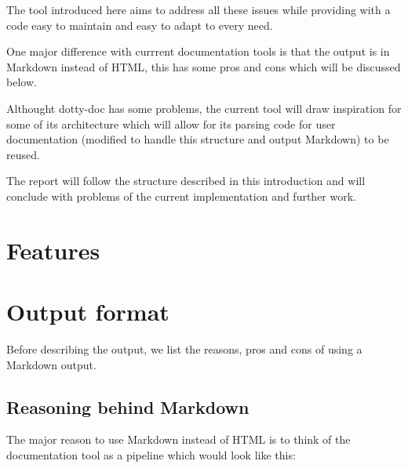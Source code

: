 \documentclass{report}
\begin{document}
The tool introduced here aims to address all these issues while providing with a code easy to maintain and easy to adapt to every need.

One major difference with currrent documentation tools is that the output is in Markdown instead of HTML, this has some pros and cons which will be discussed below.

Althought dotty-doc has some problems, the current tool will draw inspiration for some of its architecture which will allow for its parsing code for user documentation (modified to handle this structure and output Markdown) to be reused.

The report will follow the structure described in this introduction and will conclude with problems of the current implementation and further work.

\chapter{Features}

\chapter{Output format}
Before describing the output, we list the reasons, pros and cons of using a Markdown output.

\section{Reasoning behind Markdown}

The major reason to use Markdown instead of HTML is to think of the documentation tool as a pipeline which would look like this:

\begin{center}
\end{center}
\end{document}
